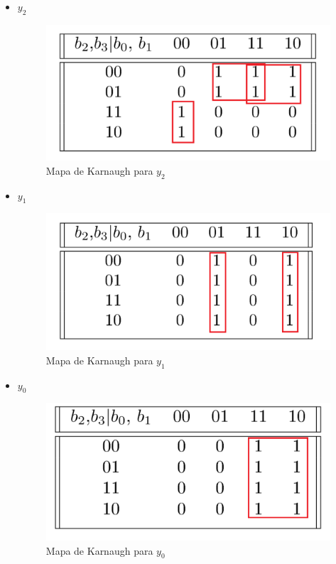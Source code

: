 \documentclass[../../informe/src/main.tex]{subfiles}
\begin{document}
\begin{enumerate}
\begin{itemize}
\item $y_2$					%

\begin{figure}[H]	%
	\centering
	\includegraphics[scale=0.5]{imagenes/karnaugh_mapa_y2.png}
	\caption{Mapa de Karnaugh para $y_2$}
	\label{fig:ej4_karnaugh_mapa_y2}
\end{figure}

\item $y_1$					%

\begin{figure}[H]	%
	\centering
	\includegraphics[scale=0.5]{imagenes/karnaugh_mapa_y1.png}
	\caption{Mapa de Karnaugh para $y_1$}
	\label{fig:ej4_karnaugh_mapa_y1}
\end{figure}

\item $y_0$					%


\begin{figure}[H]	%
	\centering
	\includegraphics[scale=0.5]{imagenes/karnaugh_mapa_y0.png}
	\caption{Mapa de Karnaugh para $y_0$}
	\label{fig:ej4_karnaugh_mapa_y0}
\end{figure}

\end{itemize} 

\end{enumerate}
 	
\end{document}
